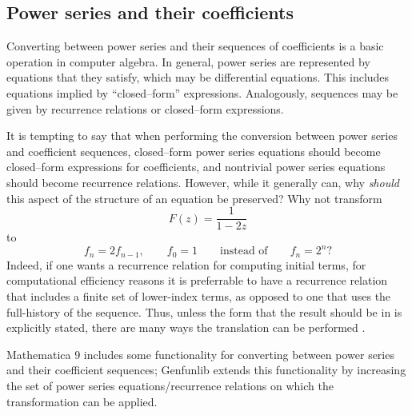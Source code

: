 \documentclass{article}
\theoremstyle{plain}
\begin{document}

\subsection{Power series and their coefficients}

Converting between power series and their sequences of coefficients is a basic
operation in computer algebra.
In general, power series are represented by equations that they satisfy, which
may be differential equations.
This includes equations implied by ``closed--form'' expressions.
Analogously, sequences may be given by recurrence relations or closed--form
expressions.

It is tempting to say that when performing the conversion between power series
and coefficient sequences,
closed--form power series equations should become
closed--form expressions for coefficients, and nontrivial power series equations
should become recurrence relations.
However, while it generally can, why \emph{should} this aspect of the structure
of an equation be preserved?
Why not transform \[ F(z) = \frac{1}{1 - 2z} \] to
\[ f_n = 2 f_{n-1}, \qquad f_0 = 1 \qquad \text{instead of} \qquad f_n = 2^n?\]
Indeed, if one wants a recurrence relation for computing initial terms,
for computational efficiency reasons it is preferrable to have a
recurrence relation that includes a finite set of lower-index terms,
as opposed to one that uses the full-history of the sequence.
Thus, unless the form that the result should be in is explicitly stated, there
are many ways the translation can be performed \cite{simpl}.

Mathematica 9 includes some functionality for converting between power series
and their coefficient sequences;
Genfunlib extends this functionality by increasing the set of power series
equations/recurrence relations on which the transformation can be applied.
\end{document}
